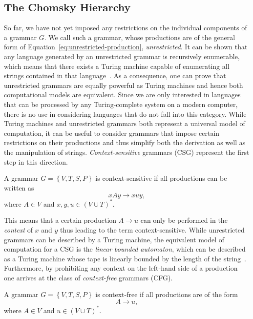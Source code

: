 \subsection{The Chomsky Hierarchy}
\label{sec:chomsky-hierarchy}
So far, we have not yet imposed any restrictions on the individual components of a grammar $G$.
We call such a grammar, whose productions are of the general form of Equation~\eqref{eq:unrestricted-production}, \emph{unrestricted}.
It can be shown that any language generated by an unrestricted grammar is recursively enumerable, which means that there exists a Turing machine capable of enumerating all strings contained in that language~\cite{linz2006introduction}.
As a consequence, one can prove that unrestricted grammars are equally powerful as Turing machines and hence both computational models are equivalent.
Since we are only interested in languages that can be processed by any Turing-complete system on a modern computer, there is no use in considering languages that do not fall into this category.
While Turing machines and unrestricted grammars both represent a universal model of computation, it can be useful to consider grammars that impose certain restrictions on their productions and thus simplify both the derivation as well as the manipulation of strings.
\emph{Context-sensitive} grammars (CSG) represent the first step in this direction.
\begin{definition}
A grammar $G = \left\{V, T, S, P\right\}$ is context-sensitive if all productions can be written as
\begin{equation}
	xAy \to xuy,
\end{equation}
where $A \in V$ and $x, y, u \in \left(V \cup T\right)^*$.
\label{def:context-sensitive-grammar}
\end{definition}
This means that a certain production $A \to u$ can only be performed in the \emph{context} of $x$ and $y$ thus leading to the term context-sensitive.
While unrestricted grammars can be described by a Turing machine, the equivalent model of computation for a CSG is the \emph{linear bounded automaton}, which can be described as a Turing machine whose tape is linearly bounded by the length of the string~\cite{linz2006introduction}.
Furthermore, by prohibiting any context on the left-hand side of a production one arrives at the class of \emph{context-free} grammars (CFG).
\begin{definition}
	A grammar $G = \left\{V, T, S, P\right\}$ is context-free if all productions are of the form
	\begin{equation}
		A \to u,
	\end{equation}
	where $A \in V$ and $u \in \left(V \cup T\right)^*$.
\end{definition}
